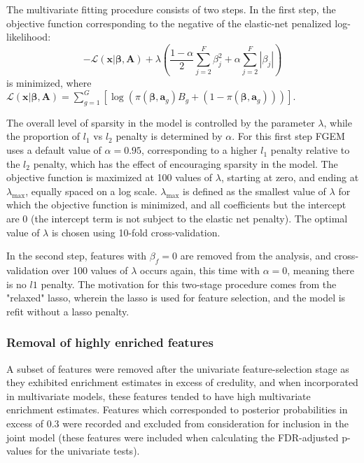 The multivariate fitting procedure consists of two steps.  In the first step, the objective function corresponding to the negative of the elastic-net penalized log-likelihood:
$$ -\mathcal{L}(\textbf{x}|\boldsymbol{\beta},\textbf{A}) + \lambda\left( \frac{1-\alpha}{2} \sum_{j=2}^F\beta_j^2 + \alpha \sum_{j=2}^F|\beta_j| \right) $$
is minimized, where \(\mathcal{L}(\textbf{x}|\boldsymbol{\beta},\textbf{A}) = \sum_{g=1}^{G}[\log\left(\pi(\boldsymbol{\beta},\textbf{a}_g)B_g+(1-\pi(\boldsymbol{\beta},\textbf{a}_g))\right)]\).
 

The overall level of sparsity in the model is controlled by the parameter \(\lambda\), while the proportion of \(l_1\) vs \(l_2\) penalty is determined by \(\alpha\).  For this first step FGEM uses a default value of $\alpha=0.95$, corresponding to a higher $l_{\text{1}}$ penalty relative to the $l_{\text{2}}$ penalty, which has the effect of encouraging sparsity in the model. The objective function is maximized at 100 values of \(\lambda\), starting at zero, and ending at \(\lambda_{\text{max}}\), equally spaced on a log scale.  \(\lambda_{\text{max}}\) is defined as the smallest value of \(\lambda\) for which the objective function is minimized, and all coefficients but the intercept are 0 (the intercept term is not subject to the elastic net penalty). The optimal value of \(\lambda\) is chosen using 10-fold cross-validation.  

In the second step, features with \(\beta_f=0\) are removed from the analysis, and cross-validation over 100 values of \(\lambda\) occurs again, this time with \(\alpha = 0\), meaning there is no \(l1\) penalty.  The motivation for this two-stage
procedure comes from the "relaxed" lasso\cite{hastie17_exten_compar_best_subset_selec}, wherein the lasso is used for feature selection, and the model is refit without a lasso penalty.  

\subsubsection{Removal of highly enriched features}\label{sec:org02cff25}

    A subset of features were removed after the univariate feature-selection stage as they exhibited enrichment estimates in excess of credulity, and when incorporated in multivariate models, these features tended to have high multivariate enrichment estimates. Features which corresponded to posterior probabilities in excess of 0.3 were recorded and excluded from consideration for inclusion in the joint model (these features were included when calculating the FDR-adjusted p-values for the univariate tests).  

